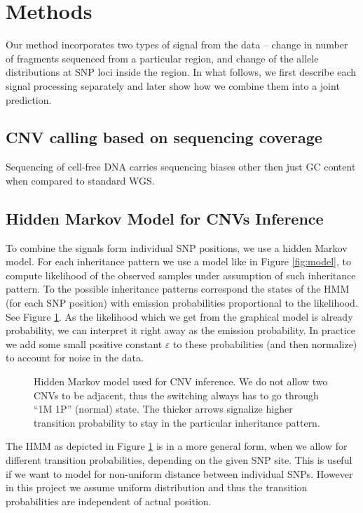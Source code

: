 \section{Methods}

Our method incorporates two types of signal from the data -- change in number of fragments sequenced from a particular region, and change of the allele distributions at SNP loci inside the region. In what follows, we first describe each signal processing separately and later show how we combine them into a joint prediction.

\subsection{CNV calling based on sequencing coverage}
Sequencing of cell-free DNA carries sequencing biases other then just GC content when compared to standard WGS. \cite{srinivasan2013}


\subsection{Hidden Markov Model for CNVs Inference}\label{ss:hmm}
To combine the signals form individual SNP positions, we use a hidden Markov model. For each inheritance pattern we use a model like in Figure \ref{fig:model}, to compute likelihood of the observed samples under assumption of such inheritance pattern. To the possible inheritance patterns correspond the states of the HMM (for each SNP position) with emission probabilities proportional to the likelihood. See Figure \ref{fig:hmm}. As the likelihood which we get from the graphical model is already probability, we can interpret it right away as the emission probability. In practice we add some small positive constant $\varepsilon$ to these probabilities (and then normalize) to account for noise in the data.

\begin{figure}[h!]
\caption{Hidden Markov model used for CNV inference. We do not allow two CNVs to be adjacent, thus the switching always has to go through ``1M 1P'' (normal) state. The thicker arrows signalize higher transition probability to stay in the particular inheritance pattern.}\label{fig:hmm}
\end{figure}

The HMM as depicted in Figure \ref{fig:hmm} is in a more general form, when we allow for different transition probabilities, depending on the given SNP site. This is useful if we want to model for non-uniform distance between individual SNPs. However in this project we assume uniform distribution and thus the transition probabilities are independent of actual position.

